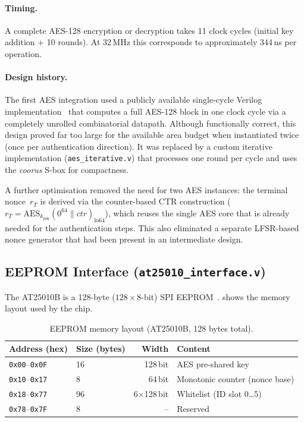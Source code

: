 \documentclass[manuscript,screen,nonacm]{acmart}
\begin{document}
\paragraph{Timing.}
A complete AES-128 encryption or decryption takes 11 clock cycles
(initial key addition + 10 rounds).
At 32\,MHz this corresponds to approximately 344\,ns per operation.

\paragraph{Design history.}
The first AES integration used a publicly available single-cycle
Verilog implementation~\cite{ehab_aes_verilog} that computes a full AES-128 block in one
clock cycle via a completely unrolled combinatorial datapath.
Although functionally correct, this design proved far too large for
the available area budget when instantiated twice (once per
authentication direction).
It was replaced by a custom iterative implementation
(\texttt{aes\_iterative.v}) that processes one round per cycle and
uses the \emph{coorus} S-box for compactness.

A further optimisation removed the need for two AES instances:
the terminal nonce~$r_T$ is derived via the counter-based CTR
construction ($r_T = \text{AES}_{k_\text{psk}}(0^{64} \| \mathit{ctr})_{\text{lo}64}$),
which reuses the single AES core that is already needed for the
authentication steps.
This also eliminated a separate LFSR-based nonce generator that had
been present in an intermediate design.

\subsection{EEPROM Interface (\texttt{at25010\_interface.v})}
\label{sec:impl:eeprom}

The AT25010B is a 128-byte ($128 \times 8$-bit) SPI EEPROM~\cite{at25010b}.
 shows the memory layout used by the chip.

\begin{table}[ht]
  \caption{EEPROM memory layout (AT25010B, 128 bytes total).}
  \label{tab:eeprom}
  \centering
  \begin{tabular}{llrl}
    \toprule
    Address (hex) & Size (bytes) & Width & Content \\
    \midrule
    \texttt{0x00}--\texttt{0x0F} & 16 & 128\,bit & AES pre-shared key \\
    \texttt{0x10}--\texttt{0x17} &  8 &  64\,bit & Monotonic counter (nonce base) \\
    \texttt{0x18}--\texttt{0x77} & 96 & 6$\times$128\,bit & Whitelist (ID slot 0\ldots5) \\
    \texttt{0x78}--\texttt{0x7F} &  8 & -- & Reserved \\
    \bottomrule
  \end{tabular}
\end{table}
\end{document}
